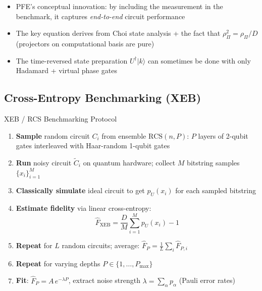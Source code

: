 \documentclass[10pt,a4paper]{article}
\begin{document}
\begin{insightbox}
\begin{itemize}
  \item PFE's conceptual innovation: by including the measurement in the benchmark, it captures \emph{end-to-end} circuit performance
  \item The key equation derives from Choi state analysis + the fact that $\rho_\Pi^2 = \rho_\Pi / D$ (projectors on computational basis are pure)
  \item The time-reversed state preparation $U^\dagger|k\rangle$ can sometimes be done with only Hadamard + virtual phase gates
\end{itemize}
\end{insightbox}

\newpage

\subsection{Cross-Entropy Benchmarking (XEB)}

\begin{algorithmbox}{XEB / RCS Benchmarking Protocol}
\begin{enumerate}
  \item \textbf{Sample} random circuit $C_i$ from ensemble $\mathrm{RCS}(n, P)$: $P$ layers of 2-qubit gates interleaved with Haar-random 1-qubit gates
  \item \textbf{Run} noisy circuit $\tilde{C}_i$ on quantum hardware; collect $M$ bitstring samples $\{x_i\}_{i=1}^M$
  \item \textbf{Classically simulate} ideal circuit to get $p_U(x_i)$ for each sampled bitstring
  \item \textbf{Estimate fidelity} via \textcolor{alertred}{linear cross-entropy}:
  \[
    \boxed{\hat{F}_{\mathrm{XEB}} = \frac{D}{M}\sum_{i=1}^M p_U(x_i) - 1}
  \]
  \item \textbf{Repeat} for $L$ random circuits; average: $\hat{F}_P = \frac{1}{L}\sum_i \hat{F}_{P,i}$
  \item \textbf{Repeat} for varying depths $P \in \{1,\ldots,P_{\max}\}$
  \item \textbf{Fit}: $\hat{F}_P = A\,e^{-\lambda P}$, extract noise strength $\lambda = \sum_\alpha p_\alpha$ (Pauli error rates)
\end{enumerate}
\end{algorithmbox}
\end{document}
